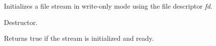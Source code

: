 
Initializes a file stream in write-only mode using the file descriptor {\it fd}.

\label{wxfileoutputstreamdtor}


Destructor.

\label{wxfileoutputstreamok}


Returns true if the stream is initialized and ready.

